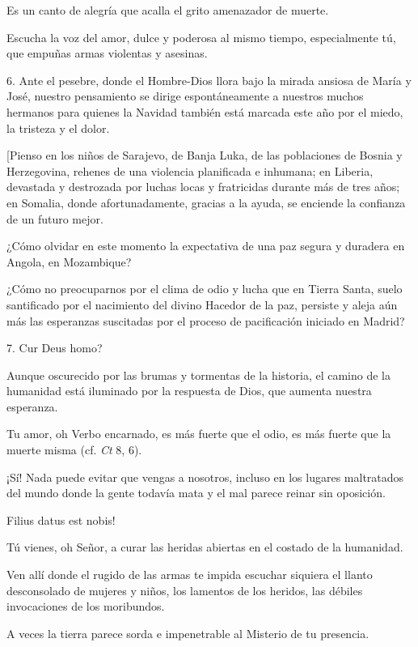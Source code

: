 \begin{body}
							Es un canto de alegría que acalla el grito amenazador de muerte.
							
							Escucha la voz del amor, dulce y poderosa al mismo tiempo, especialmente tú, que empuñas armas violentas y asesinas.
							
							6. Ante el pesebre, donde el Hombre-Dios llora bajo la mirada ansiosa de María y José, nuestro pensamiento se dirige espontáneamente a nuestros muchos hermanos para quienes la Navidad también está marcada este año por el miedo, la tristeza y el dolor.
							
							{[}Pienso en los niños de Sarajevo, de Banja Luka, de las poblaciones de Bosnia y Herzegovina, rehenes de una violencia planificada e inhumana; en Liberia, devastada y destrozada por luchas locas y fratricidas durante más de tres años; en Somalia, donde afortunadamente, gracias a la ayuda, se enciende la confianza de un futuro mejor.
							
							¿Cómo olvidar en este momento la expectativa de una paz segura y duradera en Angola, en Mozambique?
							
							¿Cómo no preocuparnos por el clima de odio y lucha que en Tierra Santa, suelo santificado por el nacimiento del divino Hacedor de la paz, persiste y aleja aún más las esperanzas suscitadas por el proceso de pacificación iniciado en Madrid?
							
							7. Cur Deus homo?
							
							Aunque oscurecido por las brumas y tormentas de la historia, el camino de la humanidad está iluminado por la respuesta de Dios, que aumenta nuestra esperanza.
							
							Tu amor, oh Verbo encarnado, es más fuerte que el odio, es más fuerte que la muerte misma (cf. \emph{Ct} 8, 6).
							
							¡Sí! Nada puede evitar que vengas a nosotros, incluso en los lugares maltratados del mundo donde la gente todavía mata y el mal parece reinar sin oposición.
							
							Filius datus est nobis!
							
							Tú vienes, oh Señor, a curar las heridas abiertas en el costado de la humanidad.
							
							Ven allí donde el rugido de las armas te impida escuchar siquiera el llanto desconsolado de mujeres y niños, los lamentos de los heridos, las débiles invocaciones de los moribundos.
							
							A veces la tierra parece sorda e impenetrable al Misterio de tu presencia.
							

\end{body}
